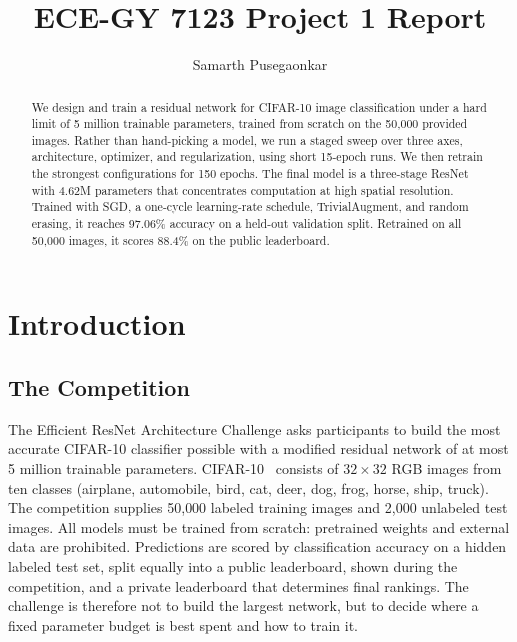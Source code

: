 \documentclass[letterpaper]{article} %
\title{ECE-GY 7123 Project 1 Report}
\author{
    Samarth Pusegaonkar
}
\begin{document}
\maketitle

\begin{abstract}
We design and train a residual network for CIFAR-10 image classification under a hard limit of 5 million trainable parameters, trained from scratch on the 50{,}000 provided images. Rather than hand-picking a model, we run a staged sweep over three axes, architecture, optimizer, and regularization, using short 15-epoch runs. We then retrain the strongest configurations for 150 epochs. The final model is a three-stage ResNet with 4.62M parameters that concentrates computation at high spatial resolution. Trained with SGD, a one-cycle learning-rate schedule, TrivialAugment, and random erasing, it reaches 97.06\% accuracy on a held-out validation split. Retrained on all 50{,}000 images, it scores 88.4\% on the public leaderboard.
\end{abstract}

\section{Introduction}

\subsection{The Competition}
The Efficient ResNet Architecture Challenge asks participants to build the most accurate CIFAR-10 classifier possible with a modified residual network of at most 5 million trainable parameters. CIFAR-10~\citep{krizhevsky2009cifar} consists of $32\times32$ RGB images from ten classes (airplane, automobile, bird, cat, deer, dog, frog, horse, ship, truck). The competition supplies 50{,}000 labeled training images and 2{,}000 unlabeled test images. All models must be trained from scratch: pretrained weights and external data are prohibited. Predictions are scored by classification accuracy on a hidden labeled test set, split equally into a public leaderboard, shown during the competition, and a private leaderboard that determines final rankings. The challenge is therefore not to build the largest network, but to decide where a fixed parameter budget is best spent and how to train it.
\end{document}
